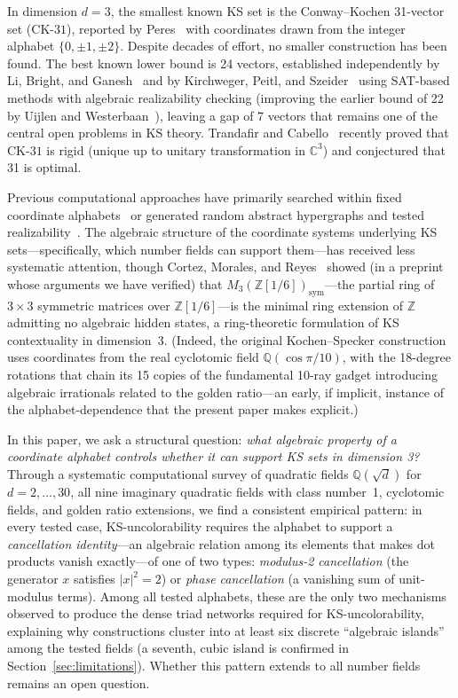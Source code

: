 \documentclass[12pt,a4paper]{article}
\newcommand{\C}{\mathbb{C}}
\newcommand{\Z}{\mathbb{Z}}
\newcommand{\Q}{\mathbb{Q}}
\newcommand{\CK}{\mathrm{CK}\text{-}31}
\begin{document}
In dimension $d = 3$, the smallest known KS set is the Conway--Kochen 31-vector set ($\CK$), reported by Peres~\cite{Peres1993} with coordinates drawn from the integer alphabet $\{0, \pm 1, \pm 2\}$. Despite decades of effort, no smaller construction has been found. The best known lower bound is 24 vectors, established independently by Li, Bright, and Ganesh~\cite{LiBrightGanesh2024} and by Kirchweger, Peitl, and Szeider~\cite{KirchwegarPeitlSzeider2023} using SAT-based methods with algebraic realizability checking (improving the earlier bound of 22 by Uijlen and Westerbaan~\cite{UijlenWesterbaan2016}), leaving a gap of 7 vectors that remains one of the central open problems in KS theory. Trandafir and Cabello~\cite{TrandafirCabello2025} recently proved that $\CK$ is rigid (unique up to unitary transformation in $\C^3$) and conjectured that 31 is optimal.

Previous computational approaches have primarily searched within fixed coordinate alphabets~\cite{Peres1991, Pavicic2004} or generated random abstract hypergraphs and tested realizability~\cite{LiBrightGanesh2024}. The algebraic structure of the coordinate systems underlying KS sets---specifically, which number fields can support them---has received less systematic attention, though Cortez, Morales, and Reyes~\cite{CortezMoralesReyes2022} showed (in a preprint whose arguments we have verified) that $M_3(\Z[1/6])_{\mathrm{sym}}$---the partial ring of $3 \times 3$ symmetric matrices over $\Z[1/6]$---is the minimal ring extension of $\Z$ admitting no algebraic hidden states, a ring-theoretic formulation of KS contextuality in dimension~3. (Indeed, the original Kochen--Specker construction~\cite{KochenSpecker1967} uses coordinates from the real cyclotomic field $\mathbb{Q}(\cos\pi/10)$, with the 18-degree rotations that chain its 15 copies of the fundamental 10-ray gadget introducing algebraic irrationals related to the golden ratio---an early, if implicit, instance of the alphabet-dependence that the present paper makes explicit.)

In this paper, we ask a structural question: \emph{what algebraic property of a coordinate alphabet controls whether it can support KS sets in dimension 3?} Through a systematic computational survey of quadratic fields $\Q(\sqrt{d})$ for $d = 2, \ldots, 30$, all nine imaginary quadratic fields with class number~1, cyclotomic fields, and golden ratio extensions, we find a consistent empirical pattern: in every tested case, KS-uncolorability requires the alphabet to support a \emph{cancellation identity}---an algebraic relation among its elements that makes dot products vanish exactly---of one of two types: \emph{modulus-2 cancellation} (the generator $x$ satisfies $|x|^2 = 2$) or \emph{phase cancellation} (a vanishing sum of unit-modulus terms). Among all tested alphabets, these are the only two mechanisms observed to produce the dense triad networks required for KS-uncolorability, explaining why constructions cluster into at least six discrete ``algebraic islands'' among the tested fields (a seventh, cubic island is confirmed in Section~\ref{sec:limitations}). Whether this pattern extends to all number fields remains an open question.
\end{document}
